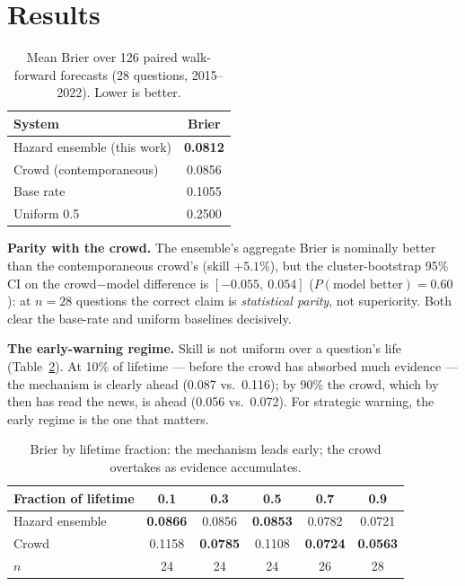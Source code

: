 \documentclass[11pt]{article}
\begin{document}
\section{Results}
\begin{table}[h]\centering
\caption{Mean Brier over 126 paired walk-forward forecasts (28 questions,
2015--2022). Lower is better.}
\label{tab:main}
\begin{tabular}{lc}
\toprule
System & Brier \\
\midrule
Hazard ensemble (this work) & \textbf{0.0812} \\
Crowd (contemporaneous)     & 0.0856 \\
Base rate                   & 0.1055 \\
Uniform 0.5                 & 0.2500 \\
\bottomrule
\end{tabular}
\end{table}

\textbf{Parity with the crowd.} The ensemble's aggregate Brier is nominally
better than the contemporaneous crowd's (skill $+5.1\%$), but the
cluster-bootstrap 95\% CI on the crowd$-$model difference is
$[-0.055,\ 0.054]$ ($P(\text{model better}) = 0.60$): at $n{=}28$ questions
the correct claim is \emph{statistical parity}, not superiority. Both clear
the base-rate and uniform baselines decisively.

\textbf{The early-warning regime.} Skill is not uniform over a question's
life (Table~\ref{tab:lifetime}). At 10\% of lifetime --- before the crowd has
absorbed much evidence --- the mechanism is clearly ahead (0.087 vs.\ 0.116);
by 90\% the crowd, which by then has read the news, is ahead (0.056 vs.\
0.072). For strategic warning, the early regime is the one that matters.

\begin{table}[h]\centering
\caption{Brier by lifetime fraction: the mechanism leads early; the crowd
overtakes as evidence accumulates.}
\label{tab:lifetime}
\begin{tabular}{lccccc}
\toprule
Fraction of lifetime & 0.1 & 0.3 & 0.5 & 0.7 & 0.9 \\
\midrule
Hazard ensemble & \textbf{0.0866} & 0.0856 & \textbf{0.0853} & 0.0782 & 0.0721 \\
Crowd           & 0.1158 & \textbf{0.0785} & 0.1108 & \textbf{0.0724} & \textbf{0.0563} \\
$n$             & 24 & 24 & 24 & 26 & 28 \\
\bottomrule
\end{tabular}
\end{table}
\end{document}
